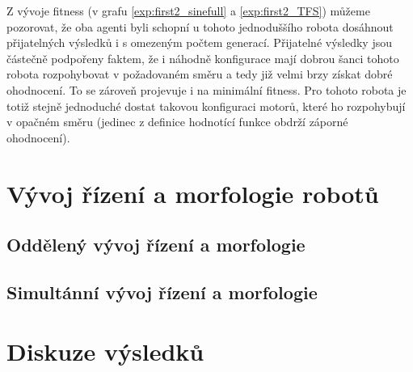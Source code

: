 \pagebreak
Z vývoje fitness (v grafu \ref{exp:first2_sinefull} a \ref{exp:first2_TFS})
můžeme pozorovat, že oba agenti byli schopní u tohoto jednoduššího robota
dosáhnout přijatelných výsledků i s omezeným počtem generací. Přijatelné
výsledky jsou částečně podpořeny faktem, že i náhodně konfigurace mají dobrou
šanci tohoto robota rozpohybovat v požadovaném směru a tedy již velmi brzy
získat dobré ohodnocení. To se zároveň projevuje i na minimální fitness. Pro
tohoto robota je totiž stejně jednoduché dostat takovou konfiguraci motorů,
které ho rozpohybují v opačném směru (jedinec z definice hodnotící funkce
obdrží záporné ohodnocení).

\section{Vývoj řízení a morfologie robotů} \label{exp2}
\subsection{Oddělený vývoj řízení a morfologie}
\subsection{Simultánní vývoj řízení a morfologie}

\section{Diskuze výsledků}
